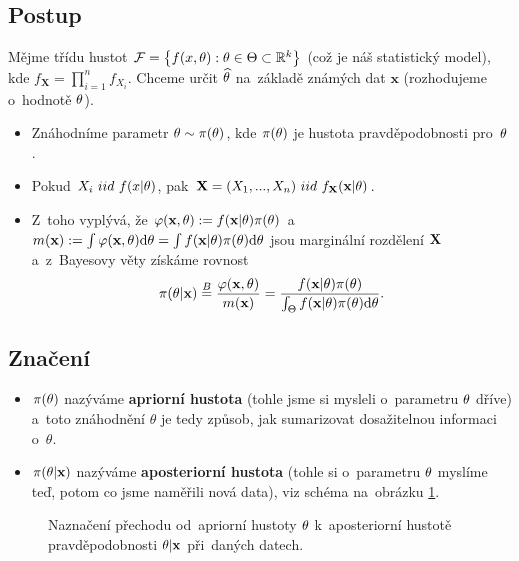 \subsection*{Postup}
Mějme třídu hustot $\mathcal{F}=\big\{ f(x,\theta):\theta\in\Theta\subset\mathbb{R}^k \big\}$ (což je náš statistický model), kde $f_\textbf{X}=\prod_{i=1}^n f_{X_i}$. Chceme určit $\widehat{\theta}$ na~základě známých dat $\textbf{x}$ (rozhodujeme o~hodnotě $\theta$). 

\begin{itemize}
	\item Znáhodníme parametr $\theta\sim\pi(\theta)$, kde $\pi(\theta)$ je hustota pravděpodobnosti pro~$\theta$.
	\item Pokud $X_i~iid~f(x|\theta)$, pak $ \textbf{X}=(X_1,...,X_n)~iid~f_{\textbf{X}}(\textbf{x}|\theta)$.
	\item Z~toho vyplývá, že $\varphi(\textbf{x},\theta):=f(\textbf{x}|\theta)\pi(\theta)$ a~$m(\textbf{x}):=\int\varphi(\textbf{x},\theta)\mathrm{d} \theta=\int f(\textbf{x}|\theta)\pi(\theta)\mathrm{d}\theta$ jsou marginální rozdělení $\textbf{X}$ a~z~Bayesovy věty získáme rovnost 
	$$ \pi(\theta|\textbf{x})\stackrel{B}{=}\frac{\varphi(\textbf{x},\theta)}{m(\textbf{x})}=\frac{f(\textbf{x}|\theta)\pi(\theta)}{\int_\Theta f(\textbf{x}|\theta)\pi(\theta)\mathrm{d}\theta}. $$
\end{itemize}
\subsection*{Značení}
\begin{itemize}
\item 	$\pi(\theta)$ nazýváme \textbf{apriorní hustota} (tohle jsme si mysleli o~parametru $\theta$ dříve) a~toto znáhodnění $\theta$ je tedy způsob, jak sumarizovat dosažitelnou informaci o~$\theta$.
\item   $\pi(\theta|\textbf{x})$ nazýváme \textbf{aposteriorní hustota} (tohle si o~parametru $\theta$ myslíme teď, potom co jsme naměřili nová data), viz schéma na~obrázku \ref{pic1.2}.
\end{itemize}

\begin{figure}[h]
	\centering  
	\caption{Naznačení přechodu od~apriorní hustoty $\theta$ k~aposteriorní hustotě pravděpodobnosti $\theta|\textbf{x}$ při~daných datech.}
	\label{pic1.2}
\end{figure}

